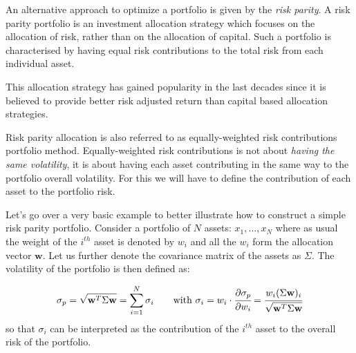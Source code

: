 An alternative approach to optimize a portfolio is given by the \emph{risk parity}. A risk parity portfolio is an investment allocation strategy which focuses on the allocation of risk, rather than on the allocation of capital. 
Such a portfolio is characterised by having equal risk contributions to the total risk from each individual asset. 

This allocation strategy has gained popularity in the last decades since it is believed to provide better risk adjusted return than capital based allocation strategies.

Risk parity allocation is also referred to as equally-weighted risk contributions portfolio method. Equally-weighted risk contributions is not about \emph{having the same volatility}, it is about having each asset contributing in the same way to the portfolio overall volatility. For this we will have to define the contribution of each asset to the portfolio risk. 

Let's go over a very basic example to better illustrate how to construct a simple risk parity portfolio. Consider a portfolio of \(N\) assets: \(x_{1}, \ldots, x_N\) where as usual the weight of the $i^{th}$ asset is denoted by \(w_{i}\) and all the \(w_{i}\) form the allocation vector \(\mathbf{w}\). Let us further denote the covariance matrix of the assets as \(\Sigma\). The volatility of the portfolio is then defined as:

\begin{equation} 
\sigma_p={\sqrt {\mathbf{w}^T\Sigma \mathbf{w}}} = \sum_{i=1}^{N}\sigma _{i}\qquad\textrm{with}~\sigma _{i} = w_{i}\cdot \cfrac{\partial\sigma_p}{\partial w_{i}}={\cfrac {w_{i}(\Sigma \mathbf{w})_{i}}{\sqrt {\mathbf{w}^T\Sigma \mathbf{w}}}}
\end{equation}
so that \(\sigma _{i}\) can be interpreted as the contribution of the $i^{th}$ asset to the overall risk of the portfolio.

